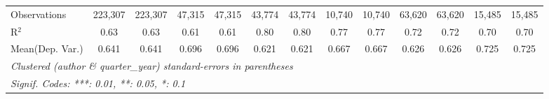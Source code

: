 \begin{tabular}{lcccccccccccc}
   Observations                             & 223,307       & 223,307       & 47,315       & 47,315  & 43,774        & 43,774        & 10,740  & 10,740  & 63,620       & 63,620       & 15,485       & 15,485\\  
   R$^2$                                    & 0.63          & 0.63          & 0.61         & 0.61    & 0.80          & 0.80          & 0.77    & 0.77    & 0.72         & 0.72         & 0.70         & 0.70\\  
Mean(Dep. Var.) & 0.641 & 0.641 & 0.696 & 0.696 & 0.621 & 0.621 & 0.667 & 0.667 & 0.626 & 0.626 & 0.725 & 0.725 \\
   \midrule \midrule
   \multicolumn{13}{l}{\emph{Clustered (author \& quarter\_year) standard-errors in parentheses}}\\
   \multicolumn{13}{l}{\emph{Signif. Codes: ***: 0.01, **: 0.05, *: 0.1}}\\
\end{tabular}
\par\endgroup
